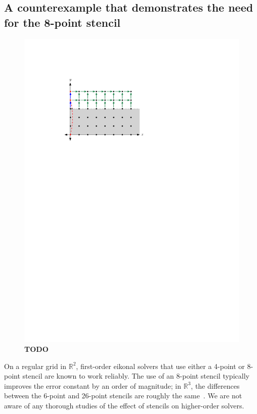 \documentclass{siamart190516}
\begin{document}
\subsection{A counterexample that demonstrates the need for the
  8-point stencil}\label{ssec:counterexample}

\begin{figure}
  \centering
  \includegraphics{bad-4point.pdf}
  \caption{\textbf{TODO}}
\end{figure}

On a regular grid in $\mathbb{R}^2$, first-order eikonal solvers that
use either a 4-point or 8-point stencil are known to work
reliably. The use of an 8-point stencil typically improves the error
constant by an order of magnitude; in $\mathbb{R}^3$, the differences
between the 6-point and 26-point stencils are roughly the
same~\cite{Potter:2019ab}. We are not aware of any thorough studies of
the effect of stencils on higher-order solvers.
\end{document}
